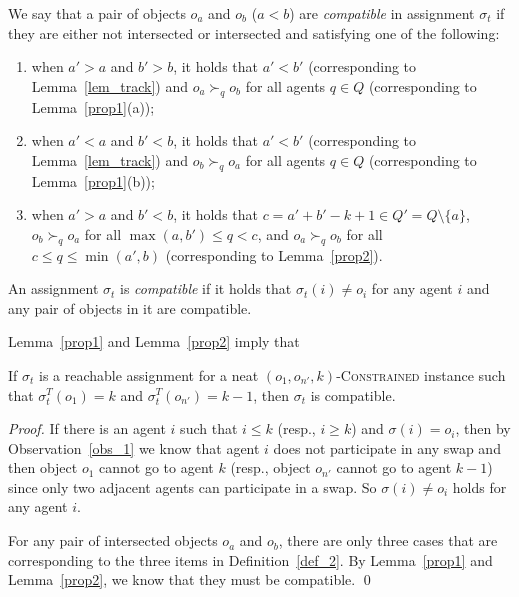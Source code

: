 \begin{definition}\label{def_2}
    We say that a pair of objects $o_a$ and $o_b$ ($a< b$) are \emph{compatible} in assignment $\sigma_t$ if they are either not intersected or intersected and satisfying one of the following:\\
    \begin{enumerate}
        \item when $a'>a$ and $b'>b$, it holds that $a'<b'$ (corresponding to Lemma~\ref{lem_track}) and
        $o_a \succ_q o_b$ for all agents $q\in Q$ (corresponding to  Lemma~\ref{prop1}(a));\\
        \item when $a'<a$ and $b'<b$, it holds that $a'<b'$ (corresponding to Lemma~\ref{lem_track}) and  $o_b \succ_q o_a$ for all agents $q\in Q$ (corresponding to Lemma~\ref{prop1}(b));\\
        \item when $a'>a$ and $b'<b$, it holds that $c=a'+b'-k+1\in Q'=Q\setminus \{a\}$, $o_b \succ_q o_a$ for all $\max(a,b')\leq q < c$, and $o_a \succ_q o_b$ for all $c \leq q \leq \min(a',b)$ (corresponding to Lemma~\ref{prop2}).\\

    \end{enumerate}
\end{definition}



\begin{definition}\label{def_3}
An assignment $\sigma_t$ is \emph{compatible} if it holds that $\sigma_t(i)\neq o_i$ for any agent $i$ and any pair of objects in it are compatible.
\end{definition}

Lemma~\ref{prop1} and Lemma~\ref{prop2} imply that
\begin{lemma}\label{necessary}
If  $\sigma _t$ is a reachable assignment for a neat $(o_1,o_{n'},k)$-\textsc{Constrained} instance
such that $\sigma^T_t(o_1)=k$ and $\sigma^T_t(o_{n'})=k-1$, then $\sigma _t$ is compatible.
\end{lemma}
\begin{proof}
If there is an agent $i$ such that $i\leq k$ (resp., $i\geq k$) and $\sigma(i)= o_i$, then by Observation~\ref{obs_1} we know that agent $i$ does not participate in any swap
and then object $o_1$ cannot go to agent $k$ (resp., object $o_{n'}$ cannot go to agent $k-1$) since only two adjacent agents can participate in a swap.
So $\sigma(i)\neq o_i$ holds for any agent $i$.

For any pair of intersected objects $o_a$ and $o_b$, there are only three cases that are corresponding to the three items in Definition~\ref{def_2}.
By  Lemma~\ref{prop1} and Lemma~\ref{prop2}, we know that they must be compatible. \qed
\end{proof}


